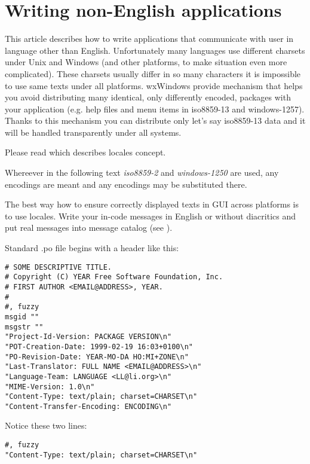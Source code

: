 \section{Writing non-English applications}\label{nonenglishoverview}

This article describes how to write applications that communicate with
user in language other than English. Unfortunately many languages use
different charsets under Unix and Windows (and other platforms, to make
situation even more complicated). These charsets usually differ in so
many characters it is impossible to use same texts under all platforms.
wxWindows provide mechanism that helps you avoid distributing many
identical, only differently encoded, packages with your application 
(e.g. help files and menu items in iso8859-13 and windows-1257). Thanks
to this mechanism you can distribute only let's say iso8859-13 data 
and it will be handled transparently under all systems.

Please read  which
describes locales concept.

Whereever in the following text {\it iso8859-2} and {\it windows-1250} are
used, any encodings are meant and any encodings may be substituted there.



The best way how to ensure correctly displayed texts in GUI across platforms
is to use locales. Write your in-code messages in English or without 
diacritics and put real messages into message catalog (see 
).

Standard .po file begins with a header like this:

\begin{verbatim}
# SOME DESCRIPTIVE TITLE.
# Copyright (C) YEAR Free Software Foundation, Inc.
# FIRST AUTHOR <EMAIL@ADDRESS>, YEAR.
#
#, fuzzy
msgid ""
msgstr ""
"Project-Id-Version: PACKAGE VERSION\n"
"POT-Creation-Date: 1999-02-19 16:03+0100\n"
"PO-Revision-Date: YEAR-MO-DA HO:MI+ZONE\n"
"Last-Translator: FULL NAME <EMAIL@ADDRESS>\n"
"Language-Team: LANGUAGE <LL@li.org>\n"
"MIME-Version: 1.0\n"
"Content-Type: text/plain; charset=CHARSET\n"
"Content-Transfer-Encoding: ENCODING\n"
\end{verbatim}

Notice these two lines:

\begin{verbatim}
#, fuzzy
"Content-Type: text/plain; charset=CHARSET\n"
\end{verbatim}

